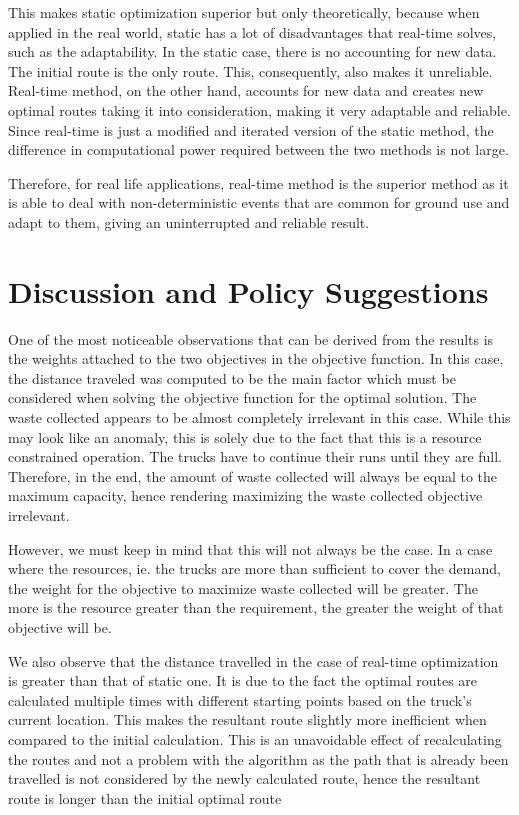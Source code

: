 \documentclass[12pt]{article}
\begin{document}
This makes static optimization superior but only theoretically, because when applied in the real world, static has a lot of disadvantages that real-time solves, such as the adaptability. In the static case, there is no accounting for new data. The initial route is the only route. This, consequently, also makes it unreliable. Real-time method, on the other hand, accounts for new data and creates new optimal routes taking it into consideration, making it very adaptable and reliable. Since real-time is just a modified and iterated version of the static method, the difference in computational power required between the two methods is not large. 

Therefore, for real life applications, real-time method is the superior method as it is able to deal with non-deterministic events that are common for ground use and adapt to them, giving an uninterrupted and reliable result.


\section{Discussion and Policy Suggestions}
One of the most noticeable observations that can be derived from the results is the weights attached to the two objectives in the objective function. In this case, the distance traveled was computed to be the main factor which must be considered when solving the objective function for the optimal solution. The waste collected appears to be almost completely irrelevant in this case. While this may look like an anomaly, this is solely due to the fact that this is a resource constrained operation. The trucks  have to continue their runs until they are full. Therefore, in the end, the amount of waste collected will always be equal to the maximum capacity, hence rendering maximizing the waste collected objective irrelevant.

However, we must keep in mind that this will not always be the case. In a case where the resources, ie. the trucks are more than sufficient to cover the demand, the weight for the objective to maximize waste collected will be greater. The more is the resource greater than the requirement, the greater the weight of that objective will be.

We also observe that the distance travelled in the case of real-time optimization is greater than that of static one. It is due to the fact the optimal routes are calculated multiple times with different starting points based on the truck's current location. This makes the resultant route slightly more inefficient when compared to the initial calculation. This is an unavoidable effect of recalculating the routes and not a problem with the algorithm as the path that is already been travelled is not considered by the newly calculated route, hence the resultant route is longer than the initial optimal route
\end{document}
